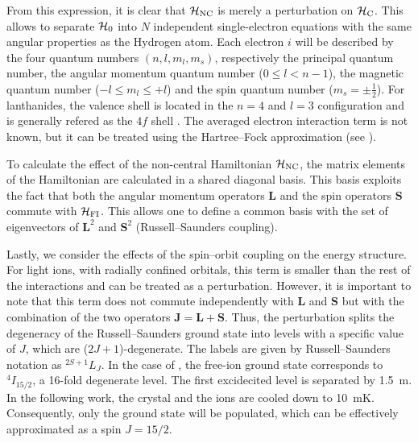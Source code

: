 From this expression, it is clear that $\mathcal{H}_{\text{NC}}$ is merely a perturbation on $\mathcal{H}_{\text{C}}$. This allows to separate $\mathcal{H}_{\text{0}}$ into $N$ independent single-electron equations with the same angular properties as the Hydrogen atom. Each electron $i$ will be described by the four quantum numbers $(n, l, m_l, m_s)$, respectively the principal quantum number, the angular momentum quantum number ($0\leq l<n-1$), the magnetic quantum number ($-l\leq m_l\leq +l$) and the spin quantum number ($m_s=\pm\tfrac{1}{2}$). For lanthanides, the valence shell is located in the $n=4$ and $l=3$ configuration and is generally refered as the $4f$ shell . The averaged electron interaction term is not known, but it can be treated using the Hartree--Fock approximation (see ).

To calculate the effect of the non-central Hamiltonian $\mathcal{H}_{\text{NC}}$, the matrix elements of the Hamiltonian are calculated in a shared diagonal basis. This basis exploits the fact that both the angular momentum operators $\mathbf{L}$ and the spin operators $\mathbf{S}$ commute with $\mathcal{H}_{\text{FI}}$. This allows one to define a common basis with the set of eigenvectors of $\mathbf{L}^2$ and $\mathbf{S}^2$ (Russell--Saunders coupling).

Lastly, we consider the effects of the spin--orbit coupling on the energy structure. For light ions, with radially confined orbitals, this term is smaller than the rest of the interactions and can be treated as a perturbation. However, it is important to note that this term does not commute independently with $\mathbf{L}$ and $\mathbf{S}$ but with the combination of the two operators $\mathbf{J} = \mathbf{L} + \mathbf{S}$. Thus, the perturbation splits the degeneracy of the Russell--Saunders ground state into levels with a specific value of $J$, which are ($2J+1$)-degenerate. The labels are given by Russell--Saunders notation as $^{2S+1}L_J$. In the case of \Er, the free-ion ground state corresponds to $^4I_{15/2}$, a 16-fold degenerate level. The first excidecited level is separated by 1.5~\textmu m. In the following work, the \Ca crystal and the ions are cooled down to 10~mK. Consequently, only the ground state will be populated, which can be effectively approximated as a spin $J=15/2$.


